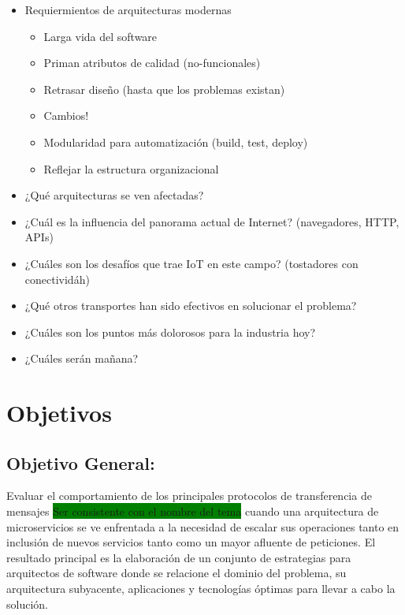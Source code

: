 \begin{itemize}
  \item Requiermientos de arquitecturas modernas
  
  \begin{itemize}
    \item Larga vida del software
    \item Priman atributos de calidad (no-funcionales)
    \item Retrasar diseño (hasta que los problemas existan)
    \item Cambios!
    \item Modularidad para automatización (build, test, deploy)
    \item Reflejar la estructura organizacional
  \end{itemize}

  \item ¿Qué arquitecturas se ven afectadas?
  \item ¿Cuál es la influencia del panorama actual de Internet? (navegadores, HTTP, APIs)
  \item ¿Cuáles son los desafíos que trae IoT en este campo? (tostadores con conectividáh)
  \item ¿Qué otros transportes han sido efectivos en solucionar el problema?
  \item ¿Cuáles son los puntos más dolorosos para la industria hoy?
  \item ¿Cuáles serán mañana?
\end{itemize}


\section{Objetivos}

\subsection{Objetivo General:}
Evaluar el comportamiento de los principales protocolos de transferencia de mensajes \colorbox{green}{Ser consistente con el nombre del tema} cuando una arquitectura de microservicios se ve enfrentada a la necesidad de escalar sus operaciones tanto en inclusión de nuevos servicios tanto como un mayor afluente de peticiones.
El resultado principal es la elaboración de un conjunto de estrategias para arquitectos de software donde se relacione el dominio del problema, su arquitectura subyacente, aplicaciones y tecnologías óptimas para llevar a cabo la solución.

